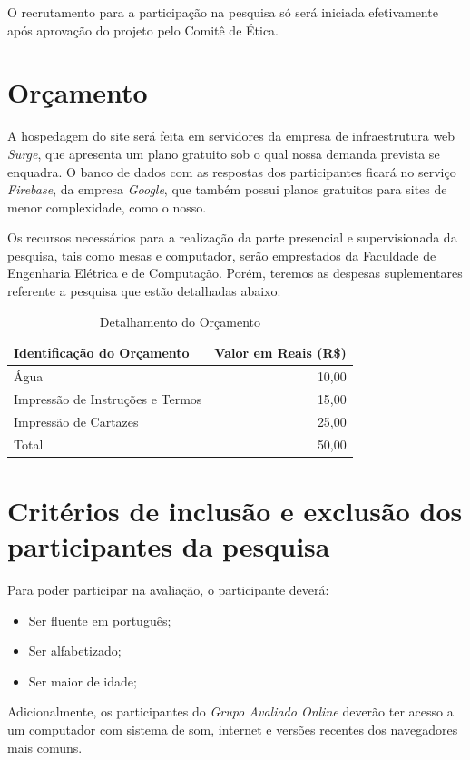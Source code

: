 \documentclass[a4paper,11pt,titlepage,singlespacing]{article}
\begin{document}
\noindent O recrutamento para a participação na pesquisa só será iniciada efetivamente após aprovação do projeto pelo Comitê de Ética.

\section{Orçamento}
\noindent A hospedagem do site será feita em servidores da empresa de infraestrutura web \textit{Surge}, que apresenta um plano gratuito sob o qual nossa demanda prevista se enquadra. O banco de dados com as respostas dos participantes ficará no serviço \textit{Firebase}, da empresa \textit{Google}, que também possui planos gratuitos para sites de menor complexidade, como o nosso.

Os recursos necessários para a realização da parte presencial e supervisionada da pesquisa, tais como mesas e computador, serão emprestados da Faculdade de Engenharia Elétrica e de Computação. Porém, teremos as despesas suplementares referente a pesquisa que estão detalhadas abaixo:

\begin{table}[H]
\caption{Detalhamento do Orçamento}
\centering
\vspace{0.5cm}
\begin{tabular}{l|r}
Identificação do Orçamento & Valor em Reais (R\$) \\
\hline 
Água        & 10,00 \\
Impressão de Instruções e Termos  & 15,00 \\
Impressão de Cartazes  & 25,00 \\
\hline 
Total & 50,00
\end{tabular}
\end{table}

\section{Critérios de inclusão e exclusão dos participantes da pesquisa}

\noindent Para poder participar na avaliação, o participante deverá:

\begin{itemize}
    \item Ser fluente em português;
    \item Ser alfabetizado;
    \item Ser maior de idade;
\end{itemize}

\noindent Adicionalmente, os participantes do \textit{Grupo Avaliado Online} deverão ter acesso a um computador com sistema de som, internet e versões recentes dos navegadores mais comuns.
\end{document}
